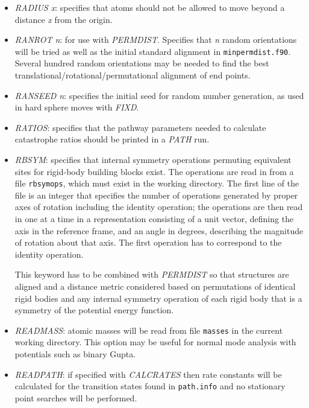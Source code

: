 \documentclass[12pt,a4paper,dvips]{article}
\begin{document}
\begin{itemize}
\item {\it RADIUS x\/}: specifies that atoms should not be allowed to move beyond a 
distance {\it x\/} from the origin.

\item {\it RANROT n\/}: for use with {\it PERMDIST\/}. Specifies
that {\it n\/} random orientations will be tried as well as the
initial standard alignment in {\tt minpermdist.f90}. Several hundred
random orientations may be needed to find the best translational/rotational/permutational
alignment of end points.

\item {\it RANSEED n\/}: specifies the initial seed for random number generation, as used in 
hard sphere moves with {\it FIXD}.

\item {\it RATIOS\/}: specifies that the pathway parameters needed to calculate catastrophe
ratios should be printed in a {\it PATH\/} run.

\item {\it RBSYM\/}: specifies that internal symmetry operations permuting equivalent sites for
rigid-body building blocks exist. The operations are read in from a file {\tt rbsymops}, which must
exist in the working directory. The first line of the file is an integer that specifies the number
of operations generated by proper axes of rotation including the identity operation; the operations
are then read in one at a time in a representation consisting of a unit vector, defining the
axis in the reference frame, and an angle in degrees, describing the magnitude of rotation about
that axis. The first operation has to correspond to the identity operation.

This keyword has to be combined with {\it PERMDIST\/} so that structures are aligned and
a distance metric considered based on permutations of identical rigid
bodies and any internal symmetry operation of each rigid body that is a symmetry
of the potential energy function.

\item {\it READMASS\/}: atomic masses will be read from file {\tt masses} in the
current working directory. This option may be useful for normal mode analysis
with potentials such as binary Gupta.

\item {\it READPATH\/}: if specified with {\it CALCRATES\/} then rate constants will be
calculated for the transition states found in {\tt path.info} and no stationary point
searches will be performed.


\end{itemize}
\end{document}

